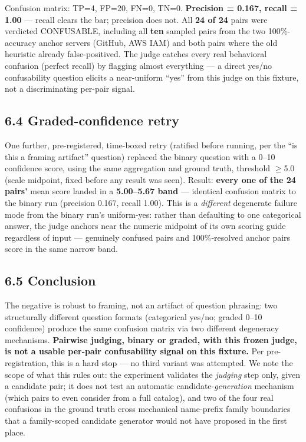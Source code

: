 Confusion matrix: TP=4, FP=20, FN=0, TN=0. \textbf{Precision = 0.167,
recall = 1.00} --- recall clears the bar; precision does not. All
\textbf{24 of 24} pairs were verdicted CONFUSABLE, including all
\textbf{ten} sampled pairs from the two 100\%-accuracy anchor servers
(GitHub, AWS IAM) and both pairs where the old heuristic already
false-positived. The judge catches every real behavioral confusion
(perfect recall) by flagging almost everything --- a direct yes/no
confusability question elicits a near-uniform ``yes'' from this judge on
this fixture, not a discriminating per-pair signal.

\hypertarget{graded-confidence-retry}{%
\subsection{6.4 Graded-confidence retry}\label{graded-confidence-retry}}

One further, pre-registered, time-boxed retry (ratified before running,
per the ``is this a framing artifact'' question) replaced the binary
question with a 0--10 confidence score, using the same aggregation and
ground truth, threshold $\geq$5.0 (scale midpoint, fixed before any result
was seen). Result: \textbf{every one of the 24 pairs'} mean score landed
in a \textbf{5.00--5.67 band} --- identical confusion matrix to the
binary run (precision 0.167, recall 1.00). This is a \emph{different}
degenerate failure mode from the binary run's uniform-yes: rather than
defaulting to one categorical answer, the judge anchors near the numeric
midpoint of its own scoring guide regardless of input --- genuinely
confused pairs and 100\%-resolved anchor pairs score in the same narrow
band.

\hypertarget{conclusion}{%
\subsection{6.5 Conclusion}\label{conclusion}}

The negative is robust to framing, not an artifact of question phrasing:
two structurally different question formats (categorical yes/no; graded
0--10 confidence) produce the same confusion matrix via two different
degeneracy mechanisms. \textbf{Pairwise judging, binary or graded, with
this frozen judge, is not a usable per-pair confusability signal on this
fixture.} Per pre-registration, this is a hard stop --- no third variant
was attempted. We note the scope of what this rules out: the experiment
validates the \emph{judging} step only, given a candidate pair; it does
not test an automatic candidate-\emph{generation} mechanism (which pairs
to even consider from a full catalog), and two of the four real
confusions in the ground truth cross mechanical name-prefix family
boundaries that a family-scoped candidate generator would not have
proposed in the first place.

